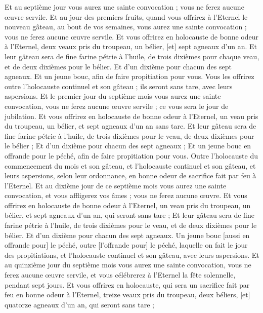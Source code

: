 \begin{multicols}{2}
Et au septième jour vous aurez une sainte convocation ; vous ne ferez aucune œuvre servile.
Et au jour des premiers fruits, quand vous offrirez à l'Eternel le nouveau gâteau, au bout de vos semaines, vous aurez une sainte convocation ; vous ne ferez aucune œuvre servile.
Et vous offrirez en holocauste de bonne odeur à l'Eternel, deux veaux pris du troupeau, un bélier, [et] sept agneaux d'un an.
Et leur gâteau sera de fine farine pétrie à l'huile, de trois dixièmes pour chaque veau, et de deux dixièmes pour le bélier.
Et d'un dixième pour chacun des sept agneaux.
Et un jeune bouc, afin de faire propitiation pour vous.
Vous les offrirez outre l'holocauste continuel et son gâteau ; ils seront sans tare, avec leurs aspersions.
\VerseOne{}Et le premier jour du septième mois vous aurez une sainte convocation, vous ne ferez aucune œuvre servile ; ce vous sera le jour de jubilation.
Et vous offrirez en holocauste de bonne odeur à l'Eternel, un veau pris du troupeau, un bélier, et sept agneaux d'un an sans tare.
Et leur gâteau sera de fine farine pétrie à l'huile, de trois dixièmes pour le veau, de deux dixièmes pour le bélier ;
Et d'un dixième pour chacun des sept agneaux ;
Et un jeune bouc en offrande pour le péché, afin de faire propitiation pour vous.
Outre l'holocauste du commencement du mois et son gâteau, et l'holocauste continuel et son gâteau, et leurs aspersions, selon leur ordonnance, en bonne odeur de sacrifice fait par feu à l'Eternel.
Et au dixième jour de ce septième mois vous aurez une sainte convocation, et vous affligerez vos âmes ; vous ne ferez aucune œuvre.
Et vous offrirez en holocauste de bonne odeur à l'Eternel, un veau pris du troupeau, un bélier, et sept agneaux d'un an, qui seront sans tare ;
Et leur gâteau sera de fine farine pétrie à l'huile, de trois dixièmes pour le veau, et de deux dixièmes pour le bélier.
Et d'un dixième pour chacun des sept agneaux.
Un jeune bouc [aussi en offrande pour] le péché, outre [l'offrande pour] le péché, laquelle on fait le jour des propitiations, et l'holocauste continuel et son gâteau, avec leurs aspersions.
Et au quinzième jour du septième mois vous aurez une sainte convocation, vous ne ferez aucune œuvre servile, et vous célébrerez à l'Eternel la fête solennelle, pendant sept jours.
Et vous offrirez en holocauste, qui sera un sacrifice fait par feu en bonne odeur à l'Eternel, treize veaux pris du troupeau, deux béliers, [et] quatorze agneaux d'un an, qui seront sans tare ;

\end{multicols}
